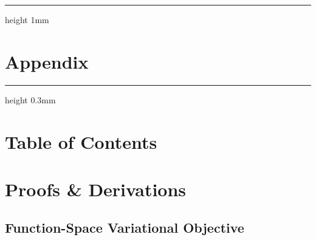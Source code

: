 %

\begin{appendices}

%
%


\setcounter{equation}{0}
\renewcommand{\theequation}{\thesection.\arabic{equation}}


\onecolumn


%

\vspace*{-20pt}
{\hrule height 1mm}
%

\section*{\LARGE \centering Appendix}
\label{sec:appendix}

\vspace{5pt}
{\hrule height 0.3mm}
\vspace{14pt}

%
\section*{Table of Contents}
\vspace*{-15pt}
\startcontents[sections]
\vspace*{-10pt}



\clearpage

\section{Proofs \& Derivations}
\label{appsec:proofs}


\subsection{Function-Space Variational Objective}
\label{appsec:function_space_elbo}


\end{appendices}
